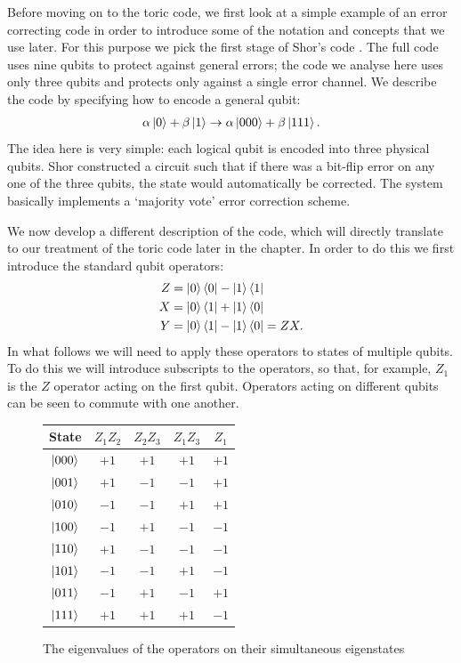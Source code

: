 Before moving on to the toric code, we first look at a simple example of an error correcting code in order to introduce some of the notation and concepts that we use later. For this purpose we pick the first stage of Shor's code \cite{shor_codes_95}. The full code uses nine qubits to protect against general errors; the code we analyse here uses only three qubits and protects only against a single error channel. We describe the code by specifying how to encode a general qubit:
\begin{align}\label{shor_state}
  \alpha\left\vert0\right\rangle + \beta\left\vert1\right\rangle \rightarrow \alpha\left\vert000\right\rangle + \beta\left\vert111\right\rangle.
\end{align}
The idea here is very simple: each logical qubit is encoded into three physical qubits. Shor constructed a circuit such that if there was a bit-flip error on any one of the three qubits, the state would automatically be corrected. The system basically implements a `majority vote' error correction scheme.

We now develop a different description of the code, which will directly translate to our treatment of the toric code later in the chapter. In order to do this we first introduce the standard qubit operators:
\begin{align}
  Z &= \left\vert0\right\rangle\left\langle 0\right\vert - \left\vert1\right\rangle\left\langle 1\right\vert \\
  X &= \left\vert0\right\rangle\left\langle 1\right\vert + \left\vert1\right\rangle\left\langle 0\right\vert \\
  Y &= \left\vert0\right\rangle\left\langle 1\right\vert - \left\vert1\right\rangle\left\langle 0\right\vert = ZX.
\end{align}
In what follows we will need to apply these operators to states of multiple qubits. To do this we will introduce subscripts to the operators, so that, for example, $Z_1$ is the $Z$ operator acting on the first qubit. Operators acting on different qubits can be seen to commute with one another.

\begin{figure}\label{ops_states}
  \begin{center}
    \begin{tabular}{c c c c c}
      State & $Z_1 Z_2$ & $Z_2 Z_3$ & $Z_1 Z_3$ & $Z_1$ \\
      \hline
      $\left\vert000\right\rangle$ & $+1$ & $+1$ & $+1$ & $+1$ \\
      $\left\vert001\right\rangle$ & $+1$ & $-1$ & $-1$ & $+1$ \\
      $\left\vert010\right\rangle$ & $-1$ & $-1$ & $+1$ & $+1$ \\
      $\left\vert100\right\rangle$ & $-1$ & $+1$ & $-1$ & $-1$ \\
      $\left\vert110\right\rangle$ & $+1$ & $-1$ & $-1$ & $-1$ \\
      $\left\vert101\right\rangle$ & $-1$ & $-1$ & $+1$ & $-1$ \\
      $\left\vert011\right\rangle$ & $-1$ & $+1$ & $-1$ & $+1$ \\
      $\left\vert111\right\rangle$ & $+1$ & $+1$ & $+1$ & $-1$
    \end{tabular}
  \end{center}
  \caption{The eigenvalues of the operators on their simultaneous eigenstates}
\end{figure}

